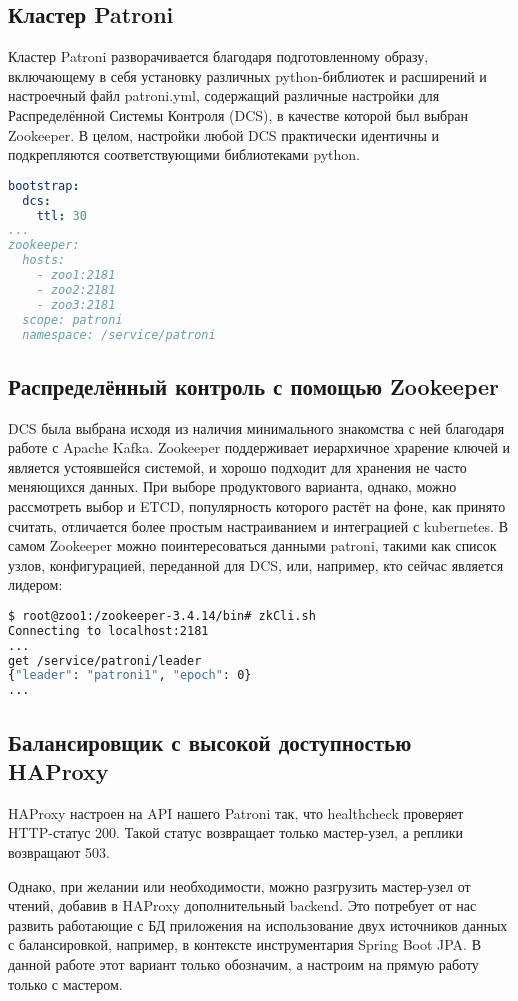 \subsection{Кластер Patroni}\label{subsec:patroni}

Кластер Patroni разворачивается благодаря подготовленному образу,
включающему в себя установку различных python-библиотек и расширений и настроечный
файл patroni.yml, содержащий различные настройки для Распределённой Системы Контроля (DCS),
в качестве которой был выбран Zookeeper.
В целом, настройки любой DCS практически идентичны и подкрепляются соответствующими библиотеками python.

\begin{lstlisting}[language=YAML, frame=single, basicstyle=\normalsize\ttfamily, breaklines=true,label={lst:patroniyaml}]
bootstrap:
  dcs:
    ttl: 30
...
zookeeper:
  hosts:
    - zoo1:2181
    - zoo2:2181
    - zoo3:2181
  scope: patroni
  namespace: /service/patroni
\end{lstlisting}

\subsection{Распределённый контроль с помощью Zookeeper}\label{subsec:zookeeper}

DCS была выбрана исходя из наличия минимального знакомства с ней благодаря работе с Apache Kafka.
Zookeeper поддерживает иерархичное храрение ключей и является устоявшейся системой, и хорошо подходит для
хранения не часто меняющихся данных.
При выборе продуктового варианта, однако, можно рассмотреть выбор и ETCD, популярность которого растёт на фоне,
как принято считать, отличается более простым настраиванием и интеграцией с kubernetes.
В самом Zookeeper можно поинтересоваться данными patroni, такими как список узлов, конфигурацией, переданной для
DCS, или, например, кто сейчас является лидером:

\begin{lstlisting}[language=bash, frame=single, basicstyle=\normalsize\ttfamily, breaklines=true,label={lst:zkclish}]
$ root@zoo1:/zookeeper-3.4.14/bin# zkCli.sh
Connecting to localhost:2181
...
get /service/patroni/leader
{"leader": "patroni1", "epoch": 0}
...
\end{lstlisting}

\subsection{Балансировщик с высокой доступностью HAProxy}\label{subsec:haproxy}

HAProxy настроен на API нашего Patroni так, что healthcheck проверяет HTTP-статус 200.
Такой статус возвращает только мастер-узел, а реплики возвращают 503.

Однако, при желании или необходимости, можно разгрузить мастер-узел от чтений, добавив в HAProxy дополнительный
backend.
Это потребует от нас развить работающие с БД приложения на использование двух источников данных с балансировкой,
например, в контексте инструментария Spring Boot JPA\@.
В данной работе этот вариант только обозначим, а настроим на прямую работу только с мастером.